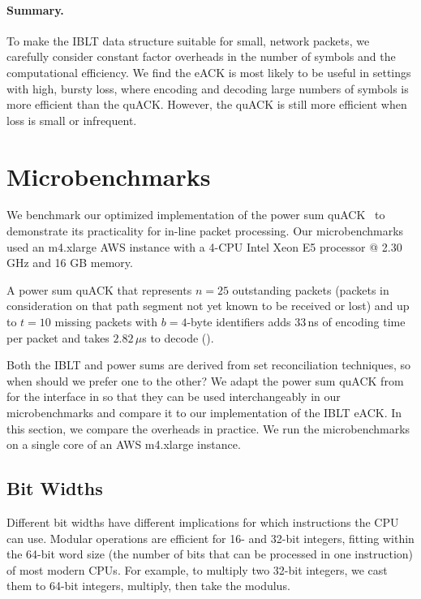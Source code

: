 \paragraph{Summary.}

To make the IBLT data structure suitable for small, network packets, we
carefully consider constant factor overheads in the
number of symbols and the computational efficiency. We find the eACK
is most likely to be useful in settings with high, bursty loss, where
encoding and decoding large numbers of symbols is more efficient than the
quACK. However, the quACK is still more efficient when
loss is small or infrequent.

\section{Microbenchmarks}

We benchmark our optimized implementation of the power sum quACK~\cite{quack-github}
to demonstrate its practicality for in-line packet processing.
Our microbenchmarks used an m4.xlarge AWS instance with a 4-CPU Intel Xeon E5
processor @ 2.30 GHz and 16 GB memory.



A power sum quACK that represents $n=25$ outstanding packets
(packets in consideration on that path segment not yet known to be received or lost)
and up to $t=10$ missing
packets with $b=4$-byte identifiers adds $33$\,ns of encoding time per
packet and takes $2.82$\,$\mu$s to decode ().

Both the IBLT and power sums are derived from set reconciliation
techniques, so when should we prefer one to the other?
We adapt the power sum quACK from \cite{yuan2024sidekick} for the interface
in 
so that they can be used interchangeably in our microbenchmarks and compare
it to our implementation of the IBLT eACK.
In this section, we compare the overheads in practice.
We run the microbenchmarks on a single core of an AWS m4.xlarge instance.



\subsection{Bit Widths}

Different bit widths have different implications for
which instructions the CPU can use. Modular operations are efficient
for 16- and 32-bit integers, fitting within the 64-bit word size (the number of
bits that can be processed in one instruction) of most modern CPUs. For example,
to multiply two 32-bit integers, we cast them to 64-bit integers, multiply,
then take the modulus.

